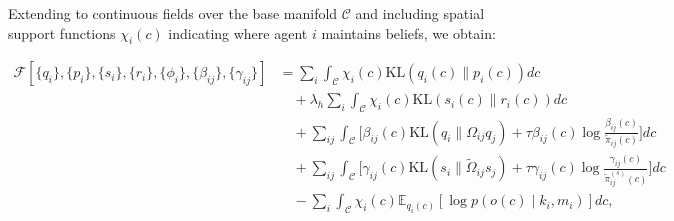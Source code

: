 \documentclass[11pt]{article}
\begin{document}
Extending to continuous fields over the base manifold $\mathcal{C}$ and including spatial support functions $\chi_i(c)$ indicating where agent $i$ maintains beliefs, we obtain:

\begin{equation}
\boxed{
\begin{aligned}
\mathcal{F}[\{q_i\}, \{p_i\}, \{s_i\}, \{r_i\}, \{\phi_i\}, \{\beta_{ij}\}, \{\gamma_{ij}\}]
&= \sum_i \int_{\mathcal{C}} \chi_i(c)  \mathrm{KL}(q_i(c) \| p_i(c))  dc \\
&\quad + \lambda_h \sum_i \int_{\mathcal{C}} \chi_i(c)  \mathrm{KL}(s_i(c) \| r_i(c))  dc \\
&\quad + \sum_{ij} \int_{\mathcal{C}} \Big[\beta_{ij}(c)  \mathrm{KL}(q_i \| \Omega_{ij} q_j) + \tau \beta_{ij}(c) \log\tfrac{\beta_{ij}(c)}{\tilde{\pi}_{ij}(c)}\Big] dc \\
&\quad + \sum_{ij} \int_{\mathcal{C}} \Big[\gamma_{ij}(c)  \mathrm{KL}(s_i \| \tilde{\Omega}_{ij} s_j) + \tau \gamma_{ij}(c) \log\tfrac{\gamma_{ij}(c)}{\tilde{\pi}^{(s)}_{ij}(c)}\Big] dc \\
&\quad - \sum_i \int_{\mathcal{C}} \chi_i(c)  \mathbb{E}_{q_i(c)}[\log p(o(c) \mid k_i, m_i)]  dc,
\end{aligned}
}
\label{eq:free_energy_functional_final}
\end{equation}
\end{document}
